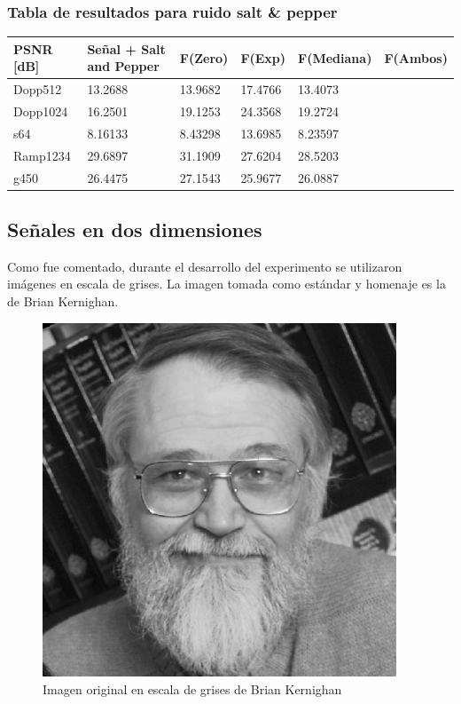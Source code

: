 \subsubsection{Tabla de resultados para ruido salt & pepper}

\begin{table}[H]
        \begin{tabular}{|l|lllll|}
                \hline
                \textbf{PSNR [dB]} & Se\~nal + Salt and Pepper  & F(Zero) & F(Exp) & F(Mediana) & F(Ambos) \\ \hline
                    Dopp512 & 13.2688 & 13.9682 & 17.4766 & 13.4073 \\
                    Dopp1024 & 16.2501 & 19.1253 & 24.3568 & 19.2724 \\
                    s64 & 8.16133 & 8.43298 & 13.6985 & 8.23597  \\
                    Ramp1234 & 29.6897 & 31.1909 & 27.6204 & 28.5203 \\
                    g450 & 26.4475 & 27.1543 & 25.9677 & 26.0887  \\ \hline
                    \end{tabular}
                \end{table}


\newpage

        \subsection{Se\~nales en dos dimensiones}

Como fue comentado, durante el desarrollo del experimento se utilizaron
im\'agenes en escala de grises. La imagen tomada como est\'andar y homenaje es 
la de Brian Kernighan.

\begin{figure}[H]
\begin {center}
\includegraphics[width=299pt]{imagenes/brian_kernighan.png}
\end {center}
\caption{Imagen original en escala de grises de Brian Kernighan}
\label{fig:SinProm}
\end{figure}

